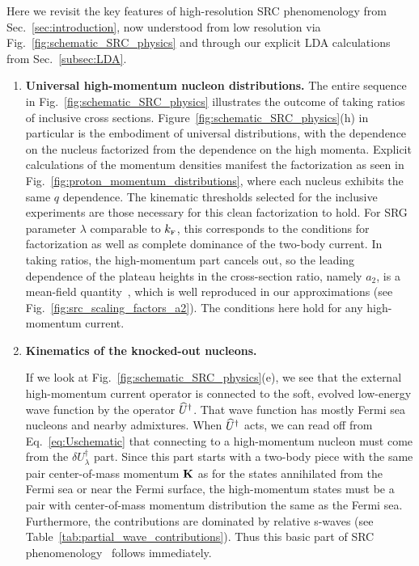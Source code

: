\documentclass[10pt,aps,prc,floatfix,twocolumn,nofootinbib]{revtex4-1}
\begin{document}
Here we revisit the key features of high-resolution SRC phenomenology from Sec.~\ref{sec:introduction}, now understood from low resolution via Fig.~\ref{fig:schematic_SRC_physics} and through our explicit LDA calculations from Sec.~\ref{subsec:LDA}.
%
\begin{enumerate}
   \item \textbf{Universal high-momentum nucleon distributions.}
  The entire sequence in Fig.~\ref{fig:schematic_SRC_physics} illustrates the outcome of taking ratios of inclusive cross sections.
  Figure~\ref{fig:schematic_SRC_physics}(h) in particular is the embodiment of universal distributions, with the dependence on the nucleus factorized from the dependence on the high momenta.
  Explicit calculations of the momentum densities manifest the factorization as seen in Fig.~\ref{fig:proton_momentum_distributions}, where each nucleus exhibits the same $q$ dependence.
  The kinematic thresholds selected for the inclusive experiments are those necessary for this clean factorization to hold.
  For SRG parameter $\lambda$ comparable to $k_{\scriptscriptstyle{\text F}}$, this corresponds to the conditions for factorization as well as complete dominance of the two-body current.
  In taking ratios, the high-momentum part cancels out, so the leading dependence of the plateau heights in the cross-section ratio, namely $a_2$, is a mean-field quantity~\cite{Anderson:2010aq,Cruz-Torres:2019fum}, which is well reproduced in our approximations (see Fig.~\ref{fig:src_scaling_factors_a2}).
  The conditions here hold for any high-momentum current.
  
  
   \item \textbf{Kinematics of the knocked-out nucleons.}

   If we look at Fig.~\ref{fig:schematic_SRC_physics}(e), we see that the external high-momentum current operator is connected to the soft, evolved low-energy wave function by the operator $\widehat U^\dagger$.
   That wave function has mostly Fermi sea nucleons and nearby admixtures.
   When $\widehat U^\dagger$ acts, we can read off from Eq.~\eqref{eq:Uschematic} that connecting to a high-momentum nucleon must come from the $\delta U_\lambda^\dagger$ part.
   Since this part starts with a two-body piece with the same pair center-of-mass momentum $\mathbf{K}$ as for the states annihilated from the Fermi sea or near the Fermi surface, the high-momentum states must be a pair with center-of-mass momentum distribution the same as the Fermi sea.
   Furthermore, the contributions are dominated by relative s-waves (see Table~\ref{tab:partial_wave_contributions}).
   Thus this basic part of SRC phenomenology~\cite{Cohen:2018gzh} follows immediately.
   

\end{enumerate}
\end{document}
